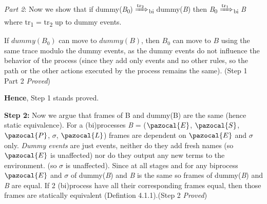 \documentclass[11pt]{article}
\newcommand{\Sa}{\pazocal{S}}
\newcommand{\Lb}{\pazocal{L}}
\newcommand{\Ea}{\pazocal{E}}
\newcommand{\Pa}{\pazocal{P}}
\begin{document}
{\it Part 2}: Now we show that if dummy({\it B}\textsubscript{0}) {$\xRightarrow[\text{}]{\text{tr\textsubscript{2}}}$}\textsubscript{bi} dummy({\it B}) then {\it B}\textsubscript{0} {$\xRightarrow[\text{}]{\text{tr\textsubscript{1}}}$}\textsubscript{bi} {\it B} where tr\textsubscript{1} = tr\textsubscript{2} up to dummy events.\newline

If $dummy(B_0)$ can move to $dummy(B)$, then $B_0$ can move to $B$ using the same trace modulo the dummy events, as the dummy events do not influence the behavior of the process (since they add only events and no other rules, so the path or the other actions executed by the process remains the same).
  \hfill \hfill (Step 1 Part 2 {\it Proved})  \newline

{\bf Hence}, Step 1 stands proved. \newline 

{\bf Step 2: }Now we argue that frames of B and dummy(B) are the same (hence static equivalence).\newline
\hspace*{14pt}For a (bi)processes {\it B} = ($\Ea$, $\Sa$, $\Pa$, $\sigma$, $\Lb$) frames are dependent on $\Ea$ and $\sigma$ only. {\it Dummy events} are just events, neither do they add fresh names (so $\Ea$ is unaffected) nor do they output any new terms to the environment. (so $\sigma$ is unaffected). Since at all stages and for any biprocess $\Ea$ and $\sigma$ of dummy({\it B}) and {\it B} is the same so frames of dummy({\it B}) and {\it B} are equal.\newline
\hspace*{14pt} If 2 (bi)process have all their corresponding frames equal, then those frames are statically equivalent (Defintion 4.1.1).\hfill \hfill (Step 2 {\it Proved})\newline
\end{document}
